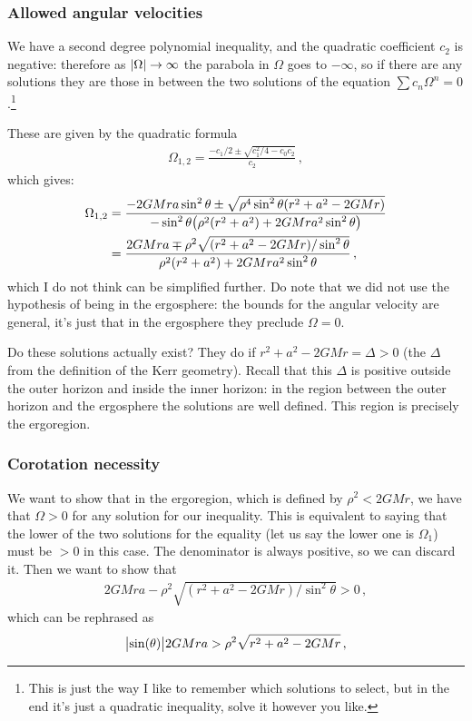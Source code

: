 \documentclass[main.tex]{subfiles}
\begin{document}
\subsubsection{Allowed angular velocities}

We have a second degree polynomial inequality, and the quadratic coefficient \(c_2 \) is negative: therefore as \(\abs{\Omega } \rightarrow \infty \) the parabola in \(\Omega \) goes to \(- \infty \), so if there are any solutions they are those in between the two solutions of the equation \(\sum c_{n} \Omega^{n} = 0\).\footnote{This is just the way I like to remember which solutions to select, but in the end it's just a quadratic inequality, solve it however you like.}

These are given by the quadratic formula 
%
\begin{align}
  \Omega_{1, 2} = \frac{- c_1/2 \pm \sqrt{c_1^2/4- c_0 c_2  }}{c_2 }
\,,
\end{align}
%
which gives: 
%
\begin{align}
\Omega_{1,2} &= \frac{-2GMra \sin^2\theta \pm \sqrt{\rho^4 \sin^{2}\theta \qty(r^2+a^2-2GMr)}}{- \sin^2\theta \qty(\rho^2(r^2+a^2)+2GMra^2 \sin^2\theta )}  \\
&= \frac{2GMra \mp \rho^2 \sqrt{ \qty(r^2+a^2-2GMr) / \sin^2 \theta }}{\rho^2(r^2+a^2)+2GMra^2 \sin^2\theta }
\,,
\end{align}
%
which I do not think can be simplified further. 
Do note that we did not use the hypothesis of being in the ergosphere: the bounds for the angular velocity are general, it's just that in the ergosphere they preclude \(\Omega = 0\). 

Do these solutions actually exist? They do if \(r^2+a^2-2GMr = \Delta >0\) (the \(\Delta \) from the definition of the Kerr geometry). Recall that this \(\Delta \) is positive outside the outer horizon and inside the inner horizon: in the region between the outer horizon and the ergosphere the solutions are well defined. 
This region is precisely the ergoregion. 

\subsubsection{Corotation necessity}

We want to show that in the ergoregion, which is defined by \(\rho^2 < 2GMr\), we have that \(\Omega > 0 \) for any solution for our inequality. This is equivalent to saying that the lower of the two solutions for the equality (let us say the lower one is \(\Omega_{1}\)) must be \(>0 \) in this case. The denominator is always positive, so we can discard it. Then we want to show that 
%
\begin{align}
2GMra - \rho^2 \sqrt{(r^2+a^2-2GMr) / \sin^2\theta }  > 0
\,,
\end{align}
%
which can be rephrased as 
%
\begin{align}
\abs{\sin(\theta )} 2GMra > \rho^2 \sqrt{r^2+a^2-2GMr}
\,,
\end{align}
%
\end{document}
